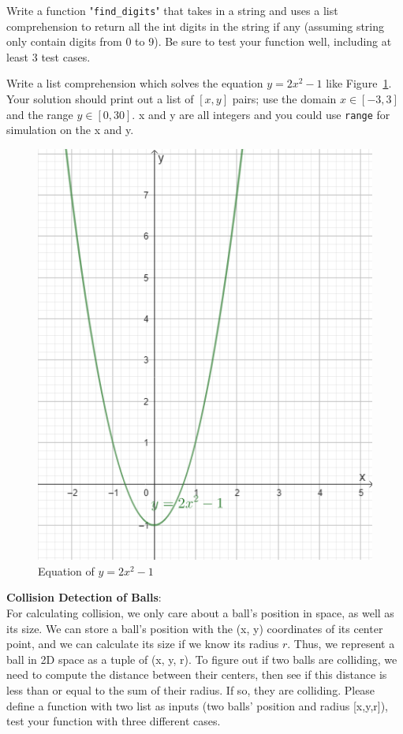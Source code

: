 \documentclass[a4paper]{article}
\begin{document}
    \begin{answer}[Question 1.4]
    Write a function "\texttt{find_digits}" that takes in a string and uses a list comprehension to return all the int digits in the string if any (assuming string only contain digits from 0 to 9). 
    Be sure to test your function well, including at least 3 test cases.
    \end{answer}
    
    \begin{answer}[Question 1.5]
    Write a list comprehension which solves the equation  $y=2x^{2}-1$ like Figure~\ref{fig:1.5q}. Your solution should print out a list of $[x,y]$ pairs; use the domain $x \in [-3,3]$ and the range $y \in [0,30]$. x and y are all integers and you could use \texttt{range} for simulation on the x and y.
    \begin{figure}[H]
        \centering
        \includegraphics[width=0.35\columnwidth]{figure/1.5q.png}
        \caption{Equation of $y=2x^{2}-1$}
        \label{fig:1.5q}
    \end{figure}
    
    \end{answer}
    
    
    \begin{answer}[Question 1.6]
    \textbf{Collision Detection of Balls}: \\
    For calculating collision, we only care about a ball’s position in space, as well as its size. We can store a ball’s position with the (x, y) coordinates of its center point, and we can calculate its size if we know its radius $r$. Thus, we represent a ball in 2D space as a tuple of (x, y, r). To figure out if two balls are colliding, we need to compute the distance between their centers, then see if this distance is less than or equal to the sum of their radius. If so, they are colliding.
    Please define a function with two list as inputs (two balls' position and radius [x,y,r]), test your function with three different cases.
    \end{answer}
    
\end{document}
